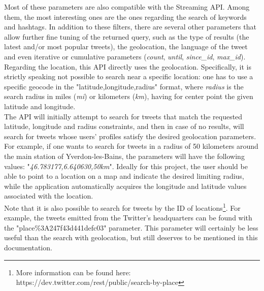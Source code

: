\documentclass[a4paper,11pt]{report}
\begin{document}
Most of these parameters are also compatible with the Streaming API. Among them, the most interesting ones are the ones regarding the search of keywords and hashtags. In addition to these filters, there are several other parameters that allow further fine tuning of the returned query, such as the type of results (the latest and/or most popular tweets), the geolocation, the language of the tweet and even iterative or cumulative parameters (\textit{count}, \textit{until}, \textit{since\_id}, \textit{max\_id}).\\

Regarding the location, this API directly uses the geolocation. Specifically, it is strictly speaking not possible to search near a specific location: one has to use a specific geocode in the "latitude,longitude,radius" format, where \emph{radius} is the search radius in miles (\emph{mi}) or kilometers (\emph{km}), having for center point the given latitude and longitude.\\

The API will initially attempt to search for tweets that match the requested latitude, longitude and radius constraints, and then in case of no results, will search for tweets whose users' profiles satisfy the desired geolocation parameters.\\

For example, if one wants to search for tweets in a radius of 50 kilometers around the main station of Yverdon-les-Bains, the parameters will have the following values: "\emph{46.783177,6.640630,50km}".
Ideally for this project, the user should be able to point to a location on a map and indicate the desired limiting radius, while the application automatically acquires the longitude and latitude values associated with the location.\\

Note that it is also possible to search for tweets by the ID of locations\footnote{More information can be found here: https://dev.twitter.com/rest/public/search-by-place}. For example, the tweets emitted from the Twitter's headquarters can be found with the "place\%3A247f43d441defc03" parameter. This parameter will certainly be less useful than the search with geolocation, but still deserves to be mentioned in this documentation.\\
\newpage
\end{document}
